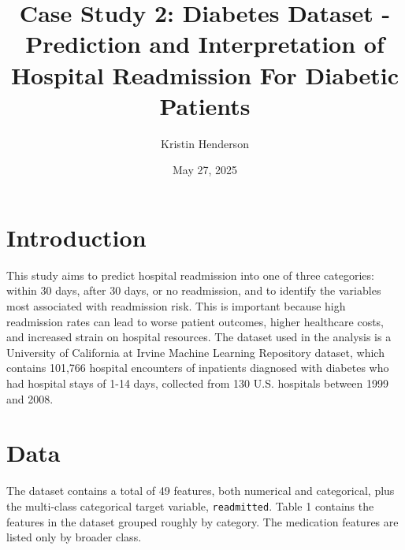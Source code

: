\documentclass{article}      %
\title{Case Study 2: Diabetes Dataset - Prediction and Interpretation of Hospital Readmission For Diabetic Patients}  %
\author{Kristin Henderson}   %
\date{May 27, 2025}          %
\begin{document}

\maketitle                   %

\section{Introduction}       %

This study aims to predict hospital readmission into one of three categories: within 30 days, after 30 days, or no readmission, and to identify the variables most associated with readmission risk. This is important because high readmission rates can lead to worse patient outcomes, higher healthcare costs, and increased strain on hospital resources. The dataset used in the analysis is a University of California at Irvine Machine Learning Repository dataset, which contains 101,766 hospital encounters of inpatients diagnosed with diabetes who had hospital stays of 1-14 days, collected from 130 U.S. hospitals between 1999 and 2008. 

\section{Data}
The dataset contains a total of 49 features, both numerical and categorical, plus the multi-class categorical target variable, \texttt{readmitted}. Table 1 contains the features in the dataset grouped roughly by category. The medication features are listed only by broader class. 
\end{document}
